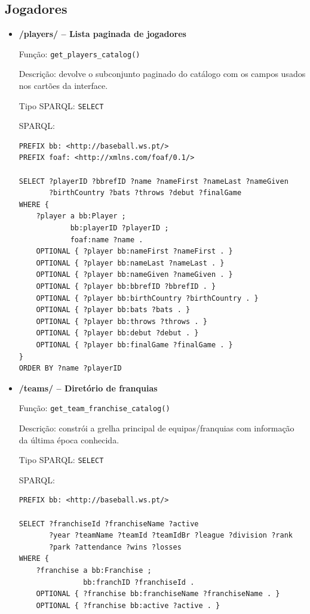 \subsection{Jogadores}

\begin{itemize}[leftmargin=*]
  \item \textbf{/players/ -- Lista paginada de jogadores}
  
  Fun\c{c}\~ao: \texttt{get\_players\_catalog()}
  
  Descri\c{c}\~ao: devolve o subconjunto paginado do cat\'alogo com os campos usados nos cartões da interface.
  
  Tipo SPARQL: \texttt{SELECT}

  SPARQL:

\begin{Verbatim}[fontsize=\scriptsize,breaklines=true]
PREFIX bb: <http://baseball.ws.pt/>
PREFIX foaf: <http://xmlns.com/foaf/0.1/>

SELECT ?playerID ?bbrefID ?name ?nameFirst ?nameLast ?nameGiven
       ?birthCountry ?bats ?throws ?debut ?finalGame
WHERE {
    ?player a bb:Player ;
            bb:playerID ?playerID ;
            foaf:name ?name .
    OPTIONAL { ?player bb:nameFirst ?nameFirst . }
    OPTIONAL { ?player bb:nameLast ?nameLast . }
    OPTIONAL { ?player bb:nameGiven ?nameGiven . }
    OPTIONAL { ?player bb:bbrefID ?bbrefID . }
    OPTIONAL { ?player bb:birthCountry ?birthCountry . }
    OPTIONAL { ?player bb:bats ?bats . }
    OPTIONAL { ?player bb:throws ?throws . }
    OPTIONAL { ?player bb:debut ?debut . }
    OPTIONAL { ?player bb:finalGame ?finalGame . }
}
ORDER BY ?name ?playerID
\end{Verbatim}

  \item \textbf{/teams/ -- Diret\'orio de franquias}
  
  Fun\c{c}\~ao: \texttt{get\_team\_franchise\_catalog()}
  
  Descri\c{c}\~ao: constr\'oi a grelha principal de equipas/franquias com informa\c{c}\~ao da \'{u}ltima \'{e}poca conhecida.
  
  Tipo SPARQL: \texttt{SELECT}

  SPARQL:

\begin{Verbatim}[fontsize=\scriptsize,breaklines=true]
PREFIX bb: <http://baseball.ws.pt/>

SELECT ?franchiseId ?franchiseName ?active
       ?year ?teamName ?teamId ?teamIdBr ?league ?division ?rank
       ?park ?attendance ?wins ?losses
WHERE {
    ?franchise a bb:Franchise ;
               bb:franchID ?franchiseId .
    OPTIONAL { ?franchise bb:franchiseName ?franchiseName . }
    OPTIONAL { ?franchise bb:active ?active . }


\end{Verbatim}
\end{itemize}

